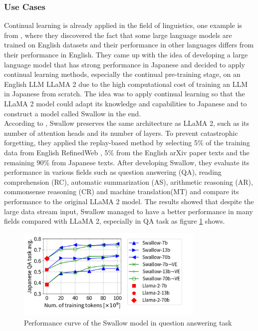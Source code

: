 \documentclass[runningheads]{llncs}
\begin{document}
\subsubsection{Use Cases}
\noindent \newline
Continual learning is already applied in the field of linguistics, one example is from \cite{Fujii24}, where they discovered the fact that some large language models are trained on English datasets and their performance 
in other languages differs from their performance in English. They came up with the idea of developing a large language model that has strong performance in Japanese and decided to apply continual learning methods, especially 
the continual pre-training stage, on an English LLM LLaMA 2 due to the high computational cost of training an LLM in Japanese from scratch. The idea was to apply continual learning so that the LLaMA 2 model could adapt its knowledge 
and capabilities to Japanese and to construct a model called Swallow in the end. \\
\noindent \newline
According to \cite{Fujii24}, Swallow preserves the same architecture as LLaMA 2, such as its number of attention heads and its number of layers. To prevent catastrophic forgetting, they applied the replay-based method
by selecting 5\% of the training data from English RefinedWeb \cite{Penedo23}, 5\% from the English arXiv paper texts and the remaining 90\% from Japanese texts. After developing Swallow, they evaluate its performance in various fields such
as question answering (QA), reading comprehension (RC), automatic summarization (AS), arithmetic reasoning (AR), commonsense reasoning (CR) and machine translation(MT) and compare its performance to the original LLaMA 2 model.
The results showed that despite the large data stream input, Swallow managed to have a better performance in many fields compared with LLaMA 2, especially in QA task as figure \ref{fig:swallow} shows.
\begin{figure}[htbp]
  \centering
  \includegraphics[width=0.8\textwidth]{swallow.png}
  \caption{Performance curve of the Swallow model in question answering task \cite{Fujii24}}
  \label{fig:swallow}
\end{figure}
\end{document}
